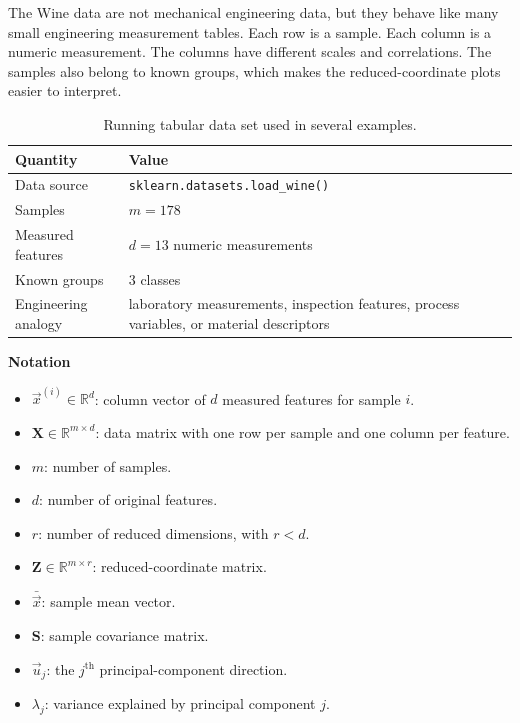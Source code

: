 \documentclass[12pt,letter]{article}
\newcommand{\mat}[1]{\mathbf{#1}}
\newcommand{\vct}[1]{\vec{#1}}
\begin{document}
The Wine data are not mechanical engineering data, but they behave like many small engineering measurement tables. Each row is a sample. Each column is a numeric measurement. The columns have different scales and correlations. The samples also belong to known groups, which makes the reduced-coordinate plots easier to interpret.

\begin{table}[H]
\centering
\caption{Running tabular data set used in several examples.}
\label{tab:wine_dataset_summary}
\begin{tabular}{p{}p{}}
\toprule
Quantity & Value \\
\midrule
Data source & \texttt{sklearn.datasets.load\_wine()} \\
Samples & $m=178$ \\
Measured features & $d=13$ numeric measurements \\
Known groups & $3$ classes \\
Engineering analogy & laboratory measurements, inspection features, process variables, or material descriptors \\
\bottomrule
\end{tabular}
\end{table}

\begin{mdframed}[middlelinewidth=0.5mm]
\begin{center}
\textbf{Notation}
\end{center}

\begin{itemize}[itemsep=0.25ex]
    \item $\vct{x}^{(i)}\in\mathbb{R}^{d}$: column vector of $d$ measured features for sample $i$.
    \item $\mat{X}\in\mathbb{R}^{m\times d}$: data matrix with one row per sample and one column per feature.
    \item $m$: number of samples.
    \item $d$: number of original features.
    \item $r$: number of reduced dimensions, with $r<d$.
    \item $\mat{Z}\in\mathbb{R}^{m\times r}$: reduced-coordinate matrix.
    \item $\bar{\vct{x}}$: sample mean vector.
    \item $\mat{S}$: sample covariance matrix.
    \item $\vct{u}_j$: the $j^{\mathrm{th}}$ principal-component direction.
    \item $\lambda_j$: variance explained by principal component $j$.
\end{itemize}
\end{mdframed}
\end{document}
